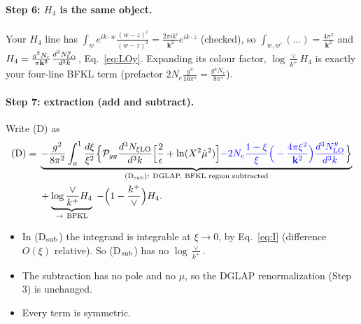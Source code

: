 \documentclass[10pt]{article}
\numberwithin{equation}{section}
\newcommand{\new}[1]{{\color{blue}#1}}
\begin{document}
\paragraph{Step 6: $H_4$ is the same object.} Your $H_4$ line has $\int_{w}e^{ik\cdot w}\frac{(w-z)^i}{(w-z)^2}=\frac{2\pi ik^i}{\mathbf k^2}e^{ik\cdot z}$ (checked), so $\int_{w,w'}(\dots)=\frac{4\pi^2}{\mathbf k^2}$ and $H_4=\frac{g^2N_c}{\pi\mathbf k^2}\frac{d^3N^y_{\rm LO}}{d^3k}$, Eq.~\eqref{eq:LOy}. Expanding its colour factor, $\log\frac{\vee}{k^+}H_4$ is exactly your four-line BFKL term (prefactor $2N_c\frac{g^4}{16\pi^5}=\frac{g^4N_c}{8\pi^5}$).

\paragraph{Step 7: extraction (add and subtract).}\label{sec:book} Write (D) as
\begin{align}
{\rm (D)}={}&\underbrace{-\frac{g^2}{8\pi^2}\int_a^1\frac{d\xi}{\xi^2}\Big\{\mathcal P_{gg}\frac{d^3N_{\xi\rm LO}}{d^3k}\Big[\frac2\epsilon+\ln(X^2\hat\mu^2)\Big]\new{-2N_c\frac{1-\xi}{\xi}\Big(-\frac{4\pi\xi^2}{\mathbf k^2}\Big)\frac{d^3N^y_{\rm LO}}{d^3k}}\Big\}}_{{\rm (D_{sub})}:\ \text{DGLAP, BFKL region subtracted}}\notag\\
&+\underbrace{\log\frac{\vee}{k^+}H_4}_{\to\ \rm BFKL}\;-\Big(1-\frac{k^+}{\vee}\Big)H_4 .
\end{align}
\begin{itemize}
\item In (D$_{\rm sub}$) the integrand is integrable at $\xi\to0$, by Eq.~\eqref{eq:I} (difference $O(\xi)$ relative). So (D$_{\rm sub}$) has no $\log\frac{\vee}{k^+}$.
\item The subtraction has no pole and no $\mu$, so the DGLAP renormalization (Step 3) is unchanged.
\item Every term is symmetric.
\end{itemize}
\end{document}

